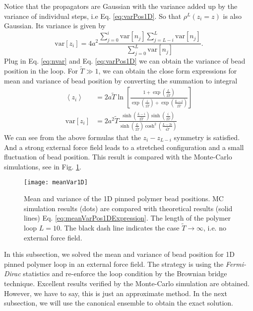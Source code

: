 Notice that the propagators are Gaussian with the variance added up by the variance of individual steps, i.e Eq. \eqref{eq:varPos1D}. So that $\rho^L(z_i = z)$ is also Gaussian. Its variance is given by
\begin{equation}
    \label{eq:varBrownianBridge}
    \text{var}\left[z_i\right] = 4a^2\frac{\sum_{j=0}^{i}\text{var}\left[n_j\right]\sum_{j=L-i}^{L}\text{var}\left[n_j\right]}{\sum_{j=0}^{L}\text{var}\left[n_j\right]}.
\end{equation}
Plug in Eq. \eqref{eq:nvar} and Eq. \eqref{eq:varPos1D} we can obtain the variance of bead position in the loop. For $\tilde{T}\gg 1$, we can obtain the close form expressions for mean and variance of bead position by converting the summation to integral
\begin{subequations}
    \label{eq:meanVarPos1DExpression}
    \begin{align}
        \left< z_i \right> & = 2 a \tilde{T} \ln\left[ \frac{1+\exp\left(\frac{L}{2\tilde{T}}\right)}{\exp\left(\frac{i}{2\tilde{T}}\right) + \exp\left(\frac{L-i}{2\tilde{T}}\right)} \right] \\
        \text{var}\left[z_i\right] & = 2 a^2 \tilde{T} \frac{ \sinh\left( \frac{L-i}{2\tilde{T}}\right) \sinh\left( \frac{i}{2\tilde{T}}\right)} {\sinh\left( \frac{L}{2\tilde{T}}\right) \cosh^2\left( \frac{L-2i}{4\tilde{T}}\right)}
    \end{align}
\end{subequations}
We can see from the above formulas that the $z_i-z_{L-i}$ symmetry is satisfied. And a strong external force field leads to a stretched configuration and a small fluctuation of bead position. This result is compared with the Monte-Carlo simulations, see in Fig. \ref{fig:meanVar1D}.

\begin{figure}[htpb]
    \centering
    \texttt{[image: meanVar1D]}
    \caption{Mean and variance of the 1D pinned polymer bead positions. MC simulation results (dots) are compared with theoretical results (solid lines) Eq. \ref{eq:meanVarPos1DExpression}. The length of the polymer loop $L=10$. The black dash line indicates the case $\tilde{T}\rightarrow\infty$, i.e. no external force field. }
    \label{fig:meanVar1D}
\end{figure}

In this subsection, we solved the mean and variance of bead position for 1D pinned polymer loop in an external force field. The strategy is using the \emph{Fermi-Dirac} statistics and re-enforce the loop condition by the Brownian bridge technique. Excellent results verified by the Monte-Carlo simulation are obtained. However, we have to say, this is just an approximate method. In the next subsection, we will use the canonical ensemble to obtain the exact solution. 

